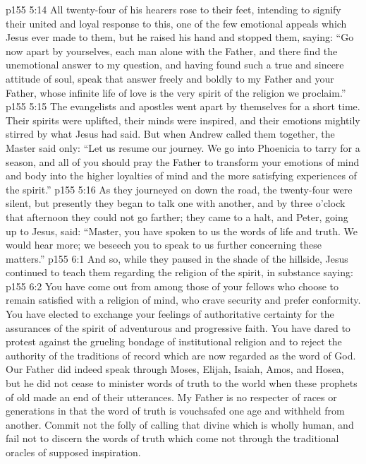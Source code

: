 \vs p155 5:14 All twenty\hyp{}four of his hearers rose to their feet, intending to signify their united and loyal response to this, one of the few emotional appeals which Jesus ever made to them, but he raised his hand and stopped them, saying: \textcolor{ubdarkred}{“Go now apart by yourselves, each man alone with the Father, and there find the unemotional answer to my question, and having found such a true and sincere attitude of soul, speak that answer freely and boldly to my Father and your Father, whose infinite life of love is the very spirit of the religion we proclaim.”}
\vs p155 5:15 The evangelists and apostles went apart by themselves for a short time. Their spirits were uplifted, their minds were inspired, and their emotions mightily stirred by what Jesus had said. But when Andrew called them together, the Master said only: \textcolor{ubdarkred}{“Let us resume our journey. We go into Phoenicia to tarry for a season, and all of you should pray the Father to transform your emotions of mind and body into the higher loyalties of mind and the more satisfying experiences of the spirit.”}
\vs p155 5:16 As they journeyed on down the road, the twenty\hyp{}four were silent, but presently they began to talk one with another, and by three o’clock that afternoon they could not go farther; they came to a halt, and Peter, going up to Jesus, said: “Master, you have spoken to us the words of life and truth. We would hear more; we beseech you to speak to us further concerning these matters.”
\vs p155 6:1 And so, while they paused in the shade of the hillside, Jesus continued to teach them regarding the religion of the spirit, in substance saying:
\pc \vs p155 6:2 \textcolor{ubdarkred}{You have come out from among those of your fellows who choose to remain satisfied with a religion of mind, who crave security and prefer conformity. You have elected to exchange your feelings of authoritative certainty for the assurances of the spirit of adventurous and progressive faith. You have dared to protest against the grueling bondage of institutional religion and to reject the authority of the traditions of record which are now regarded as the word of God. Our Father did indeed speak through Moses, Elijah, Isaiah, Amos, and Hosea, but he did not cease to minister words of truth to the world when these prophets of old made an end of their utterances. My Father is no respecter of races or generations in that the word of truth is vouchsafed one age and withheld from another. Commit not the folly of calling that divine which is wholly human, and fail not to discern the words of truth which come not through the traditional oracles of supposed inspiration.}
